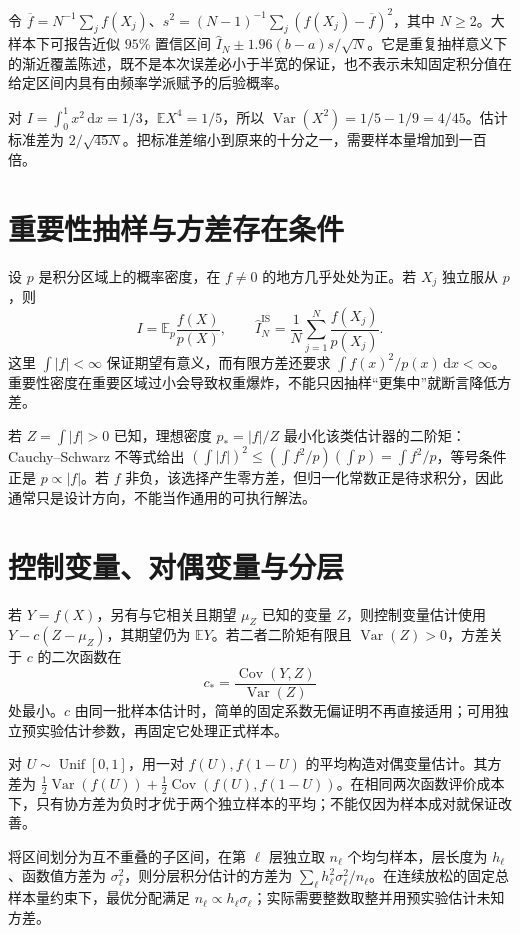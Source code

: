 \documentclass[UTF8,12pt,a4paper,fontset=fandol]{ctexbook}
\begin{document}
令 $\overline f=N^{-1}\sum_jf(X_j)$、$s^2=(N-1)^{-1}\sum_j(f(X_j)-\overline f)^2$，其中 $N\ge2$。大样本下可报告近似 $95\%$ 置信区间 $\widehat I_N\pm1.96(b-a)s/\sqrt N$。它是重复抽样意义下的渐近覆盖陈述，既不是本次误差必小于半宽的保证，也不表示未知固定积分值在给定区间内具有由频率学派赋予的后验概率。

\begin{example}[估计平方函数的积分]
对 $I=\int_0^1x^2\,\mathrm dx=1/3$，$\mathbb E X^4=1/5$，所以 $\operatorname{Var}(X^2)=1/5-1/9=4/45$。估计标准差为 $2/\sqrt{45N}$。把标准差缩小到原来的十分之一，需要样本量增加到一百倍。
\end{example}

\section{重要性抽样与方差存在条件}
设 $p$ 是积分区域上的概率密度，在 $f\ne0$ 的地方几乎处处为正。若 $X_j$ 独立服从 $p$，则
\[
 I=\mathbb E_p\frac{f(X)}{p(X)},\qquad
 \widehat I_N^{\mathrm{IS}}=\frac1N\sum_{j=1}^N\frac{f(X_j)}{p(X_j)}.
\]
这里 $\int|f|<\infty$ 保证期望有意义，而有限方差还要求 $\int f(x)^2/p(x)\,\mathrm dx<\infty$。重要性密度在重要区域过小会导致权重爆炸，不能只因抽样“更集中”就断言降低方差。

若 $Z=\int|f|>0$ 已知，理想密度 $p_*=|f|/Z$ 最小化该类估计器的二阶矩：Cauchy--Schwarz 不等式给出 $(\int|f|)^2\le(\int f^2/p)(\int p)=\int f^2/p$，等号条件正是 $p\propto|f|$。若 $f$ 非负，该选择产生零方差，但归一化常数正是待求积分，因此通常只是设计方向，不能当作通用的可执行解法。

\section{控制变量、对偶变量与分层}
若 $Y=f(X)$，另有与它相关且期望 $\mu_Z$ 已知的变量 $Z$，则控制变量估计使用 $Y-c(Z-\mu_Z)$，其期望仍为 $\mathbb EY$。若二者二阶矩有限且 $\operatorname{Var}(Z)>0$，方差关于 $c$ 的二次函数在
\[
 c_* =\frac{\operatorname{Cov}(Y,Z)}{\operatorname{Var}(Z)}
\]
处最小。$c$ 由同一批样本估计时，简单的固定系数无偏证明不再直接适用；可用独立预实验估计参数，再固定它处理正式样本。

对 $U\sim\operatorname{Unif}[0,1]$，用一对 $f(U),f(1-U)$ 的平均构造对偶变量估计。其方差为 $\tfrac12\operatorname{Var}(f(U))+\tfrac12\operatorname{Cov}(f(U),f(1-U))$。在相同两次函数评价成本下，只有协方差为负时才优于两个独立样本的平均；不能仅因为样本成对就保证改善。

将区间划分为互不重叠的子区间，在第 $\ell$ 层独立取 $n_\ell$ 个均匀样本，层长度为 $h_\ell$、函数值方差为 $\sigma_\ell^2$，则分层积分估计的方差为 $\sum_\ell h_\ell^2\sigma_\ell^2/n_\ell$。在连续放松的固定总样本量约束下，最优分配满足 $n_\ell\propto h_\ell\sigma_\ell$；实际需要整数取整并用预实验估计未知方差。
\end{document}
